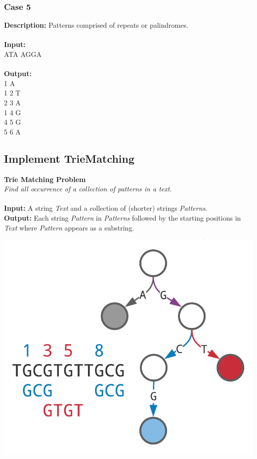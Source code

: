 \documentclass{article}
\newcommand{\code}[1]{{\fontfamily{pcr}\selectfont #1}}
\begin{document}
\subsubsection*{Case 5}
\hline \vspace{5}
\textbf{Description:} Patterns comprised of repeats or palindromes.\\ \\
\noindent \textbf{Input:}\\
\code{ATA AGGA}\\ \\
\noindent \textbf{Output:}\\
\code{0 1 A\\ 1 2 T\\ 2 3 A\\ 1 4 G\\ 4 5 G\\ 5 6 A}

\pagebreak
\subsection{Implement TrieMatching}
\hline \vspace{5}
\textbf{Trie Matching Problem}\\
\emph{Find all occurrence of a collection of patterns in a text}.\\ \\
\textbf{Input:} A string \emph{Text} and a collection of (shorter) strings \emph{Patterns}.\\
\textbf{Output:} Each string \emph{Pattern} in \emph{Patterns} followed by the starting positions in \emph{Text} where \emph{Pattern} appears as a substring.
\begin{center}
    \includegraphics[scale=0.2]{c9/logos/9B.png} 
\end{center}
\hline \vspace{5}
\end{document}

